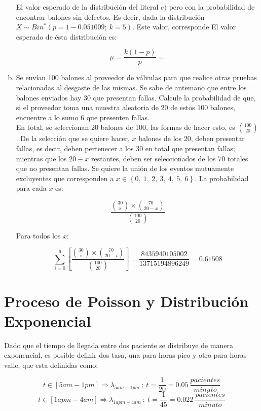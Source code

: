 \documentclass[11pt, spanish]{article}
\begin{document}
\begin{enumerate}[(a)]
El valor esperado de la distribución del literal $e)$ pero con la probabilidad de encontrar balones sin defectos. Es decir, dada la distribución $X \sim Bin^{*}(p = 1 - 0.051009;\ k = 5)$. Este valor, corresponde El valor esperado de ésta distribución es:

$$\mu = \frac{k(1 - p)}{p} = $$

\item Se envían 100 balones al proveedor de válvulas para que realice otras pruebas
relacionadas al desgaste de las mismas. Se sabe de antemano que entre los balones
enviados hay 30 que presentan fallas. Calcule la probabilidad de que, si el proveedor toma
una muestra aleatoria de 20 de estos 100 balones, encuentre a lo sumo 6 que presenten
fallas.\\

En total, se seleccionan 20 balones de 100, las formas de hacer esto, es $\binom{100}{20}$. De la selección que se quiere hacer, $x$ balones de los 20, deben presentar fallas, es decir, deben pertenecer a los 30 en total que presentan fallas; mientras que los $20 - x$ restantes, deben ser seleccionados de los 70 totales que no presentan fallas. Se quiere la unión de los eventos mutuamente excluyentes que corresponden a $x \in \left\{ 0,\ 1,\ 2,\ 3,\ 4,\ 5,\ 6 \right\}$. La probabilidad para cada $x$ es:

$$\frac{\binom{30}{x} \times \binom{70}{20 - x}}{\binom{100}{20}}$$

Para todos los $x$:

$$\sum_{i = 0}^{6} \left[ \frac{\binom{30}{i} \times \binom{70}{20 - i}}{\binom{100}{20}} \right] = \frac{8435940105002}{13715194896249} = 0.61508$$

\end{enumerate}

\pagebreak
\section{Proceso de Poisson y Distribución Exponencial}

Dado que el tiempo de llegada entre dos paciente se distribuye de manera exponencial, es
posible definir dos tasa, una para horas pico y otro para horas valle, que esta definidas
como:

$$t \in \left[ 5am - 1pm \right] \Rightarrow \lambda_{5am - 1pm}\ ;\ t = \frac{1}{20} = 0.05\ \frac{pacientes}{minuto}$$
$$t \in \left[ 1apm - 4am \right] \Rightarrow \lambda_{1apm - 4am}\ ;\ t = \frac{1}{45} = 0.022\ \frac{pacientes}{minuto}$$
\end{document}
